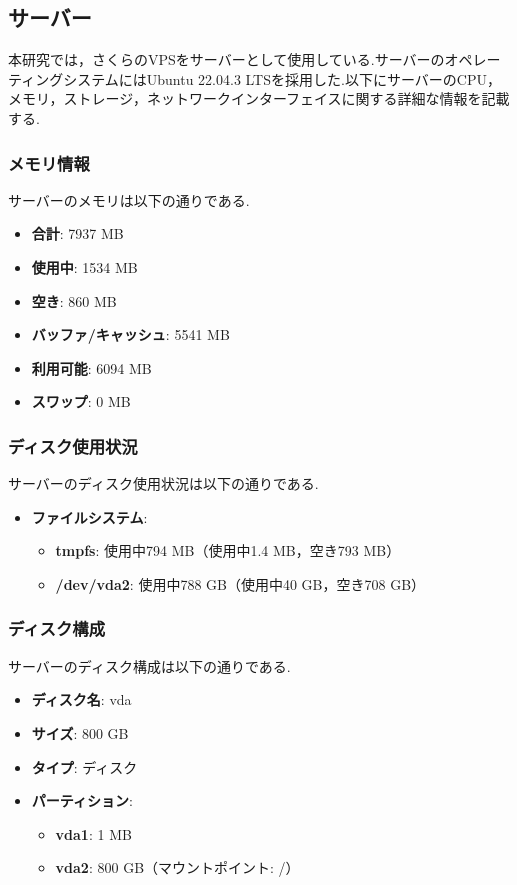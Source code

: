\documentclass[b5paper,12pt,dvipdfmx]{jsreport}
\begin{document}
\subsection{サーバー}
本研究では，さくらのVPSをサーバーとして使用している.サーバーのオペレーティングシステムにはUbuntu 22.04.3 LTSを採用した.以下にサーバーのCPU，メモリ，ストレージ，ネットワークインターフェイスに関する詳細な情報を記載する.


\subsubsection{メモリ情報}
サーバーのメモリは以下の通りである.
\begin{itemize}
    \item \textbf{合計}: 7937 MB
    \item \textbf{使用中}: 1534 MB
    \item \textbf{空き}: 860 MB
    \item \textbf{バッファ/キャッシュ}: 5541 MB
    \item \textbf{利用可能}: 6094 MB
    \item \textbf{スワップ}: 0 MB
\end{itemize}


\subsubsection{ディスク使用状況}
サーバーのディスク使用状況は以下の通りである.
\begin{itemize}
    \item \textbf{ファイルシステム}:
    \begin{itemize}
        \item \textbf{tmpfs}: 使用中794 MB（使用中1.4 MB，空き793 MB）
        \item \textbf{/dev/vda2}: 使用中788 GB（使用中40 GB，空き708 GB）
    \end{itemize}
\end{itemize}


\subsubsection{ディスク構成}
サーバーのディスク構成は以下の通りである.
\begin{itemize}
    \item \textbf{ディスク名}: vda
    \item \textbf{サイズ}: 800 GB
    \item \textbf{タイプ}: ディスク
    \item \textbf{パーティション}:
    \begin{itemize}
        \item \textbf{vda1}: 1 MB
        \item \textbf{vda2}: 800 GB（マウントポイント: /）
    \end{itemize}
\end{itemize}
\end{document}
